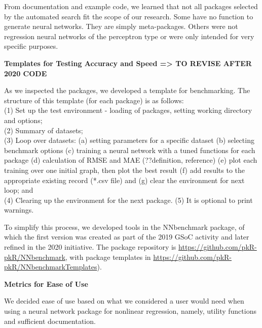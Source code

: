 From documentation and example code, we learned that not all packages
selected by the automated search fit the scope of our research. Some
have no function to generate neural networks. They are simply
meta-packages. Others were not regression neural networks of the
perceptron type or were only intended for very specific purposes.

\textbf{Templates for Testing Accuracy and Speed =\textgreater{} TO
REVISE AFTER 2020 CODE}

As we inspected the packages, we developed a template for benchmarking.
The structure of this template (for each package) is as follows:\\
(1) Set up the test environment - loading of packages, setting working
directory and options;\\
(2) Summary of datasets;\\
(3) Loop over datasets: (a) setting parameters for a specific dataset
(b) selecting benchmark options (c) training a neural network with a
tuned functions for each package (d) calculation of RMSE and MAE
(??definition, reference) (e) plot each training over one initial graph,
then plot the best result (f) add results to the appropriate existing
record (*.csv file) and (g) clear the environment for next loop; and\\
(4) Clearing up the environment for the next package. (5) It is optional
to print warnings.

To simplify this process, we developed tools in the NNbenchmark package,
of which the first version was created as part of the 2019 GSoC activity
and later refined in the 2020 initiative. The package repository is
\url{https://github.com/pkR-pkR/NNbenchmark}, with package templates in
\url{https://github.com/pkR-pkR/NNbenchmarkTemplates}).

\textbf{Metrics for Ease of Use}

We decided ease of use based on what we considered a user would need
when using a neural network package for nonlinear regression, namely,
utility functions and sufficient documentation.

